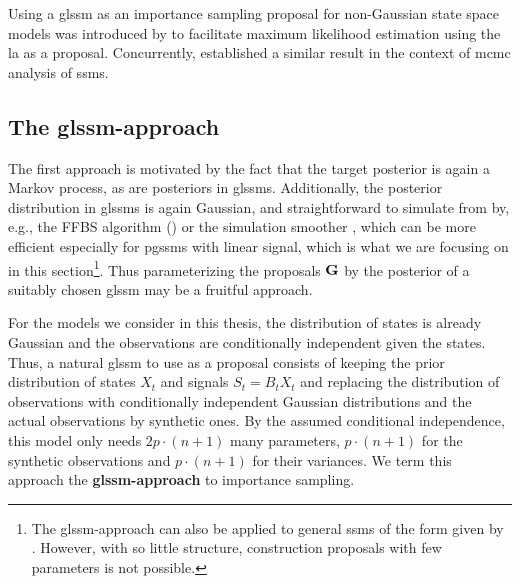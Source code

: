 Using a \gls{glssm} as an importance sampling proposal for non-Gaussian state space models was introduced by \citep{Durbin1997Monte} to facilitate maximum likelihood estimation using the \gls{la} as a proposal. Concurrently, \citep{Shephard1997Likelihood} established a similar result in the context of \gls{mcmc} analysis of \glspl{ssm}.

\subsection{\texorpdfstring{The \gls{glssm}-approach}{The GLSSM-approach}}
\label{subsec:glssm-approach}
The first approach is motivated by the fact that the target posterior is again a Markov process, as are posteriors in \glspl{glssm}. Additionally, the posterior distribution in \gls{glssm}s is again Gaussian, and straightforward to simulate from by, e.g., the FFBS algorithm () or the simulation smoother \citep{Durbin2002Simple}, which can be more efficient especially for \glspl{pgssm} with linear signal, which is what we are focusing on in this section\footnote{The \gls{glssm}-approach can also be applied to general \glspl{ssm} of the form given by . However, with so little structure, construction proposals with few parameters is not possible.}. Thus parameterizing the proposals $\mathbf G$ by the posterior of a suitably chosen \gls{glssm} may be a fruitful approach.

For the models we consider in this thesis, the distribution of states is already Gaussian and the observations are conditionally independent given the states. Thus, a natural \gls{glssm} to use as a proposal consists of keeping the prior distribution of states $X_{t}$ and signals $S_{t}=B_{t}X_{t}$ and replacing the distribution of observations with conditionally independent Gaussian distributions and the actual observations by synthetic ones. By the assumed conditional independence, this model only needs $2 p\cdot (n + 1)$ many parameters, $p\cdot (n + 1)$ for the synthetic observations and $p\cdot (n + 1)$ for their variances. We term this approach the \textbf{\gls{glssm}-approach} to importance sampling.

